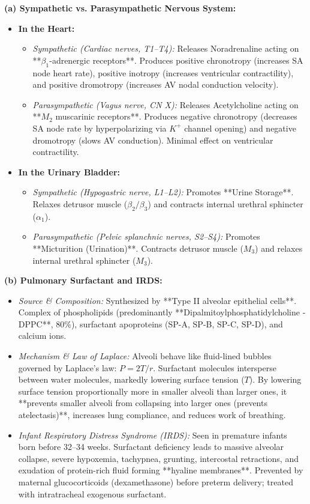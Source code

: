 \documentclass[11pt,a4paper]{article}
\begin{document}
\begin{ansbox}
\textbf{(a) Sympathetic vs. Parasympathetic Nervous System:}
\begin{itemize}[leftmargin=*]
    \item \textbf{In the Heart:}
    \begin{itemize}
        \item \textit{Sympathetic (Cardiac nerves, T1--T4):} Releases Noradrenaline acting on **$\beta_1$-adrenergic receptors**. Produces positive chronotropy (increases SA node heart rate), positive inotropy (increases ventricular contractility), and positive dromotropy (increases AV nodal conduction velocity).
        \item \textit{Parasympathetic (Vagus nerve, CN X):} Releases Acetylcholine acting on **$M_2$ muscarinic receptors**. Produces negative chronotropy (decreases SA node rate by hyperpolarizing via $K^+$ channel opening) and negative dromotropy (slows AV conduction). Minimal effect on ventricular contractility.
    \end{itemize}
    \item \textbf{In the Urinary Bladder:}
    \begin{itemize}
        \item \textit{Sympathetic (Hypogastric nerve, L1--L2):} Promotes **Urine Storage**. Relaxes detrusor muscle ($\beta_2/\beta_3$) and contracts internal urethral sphincter ($\alpha_1$).
        \item \textit{Parasympathetic (Pelvic splanchnic nerves, S2--S4):} Promotes **Micturition (Urination)**. Contracts detrusor muscle ($M_3$) and relaxes internal urethral sphincter ($M_3$).
    \end{itemize}
\end{itemize}

\textbf{(b) Pulmonary Surfactant and IRDS:}
\begin{itemize}[leftmargin=*]
    \item \textit{Source \& Composition:} Synthesized by **Type II alveolar epithelial cells**. Complex of phospholipids (predominantly **Dipalmitoylphosphatidylcholine - DPPC**, 80\%), surfactant apoproteins (SP-A, SP-B, SP-C, SP-D), and calcium ions.
    \item \textit{Mechanism \& Law of Laplace:} Alveoli behave like fluid-lined bubbles governed by Laplace's law: $P = 2T / r$. Surfactant molecules intersperse between water molecules, markedly lowering surface tension ($T$). By lowering surface tension proportionally more in smaller alveoli than larger ones, it **prevents smaller alveoli from collapsing into larger ones (prevents atelectasis)**, increases lung compliance, and reduces work of breathing.
    \item \textit{Infant Respiratory Distress Syndrome (IRDS):} Seen in premature infants born before 32--34 weeks. Surfactant deficiency leads to massive alveolar collapse, severe hypoxemia, tachypnea, grunting, intercostal retractions, and exudation of protein-rich fluid forming **hyaline membranes**. Prevented by maternal glucocorticoids (dexamethasone) before preterm delivery; treated with intratracheal exogenous surfactant.
\end{itemize}


\end{ansbox}
\end{document}
